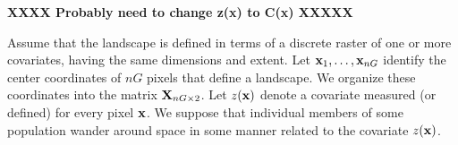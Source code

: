 {\bf XXXX Probably need to change z(x) to C(x) XXXXX}

Assume that the landscape is defined in terms of a discrete raster of
one or more covariates, having the same dimensions and extent.  Let
${\bf x}_{1},\ldots,{\bf x}_{nG}$ identify the center coordinates of
$nG$ pixels that define a landscape.  We organize these coordinates
into the matrix ${\bf X}_{nG \times 2}$.  Let $z({\bf x})$ denote a
covariate measured (or defined) for every pixel ${\bf x}$.  We suppose
that individual members of some population wander around space in some
manner related to the covariate $z({\bf x})$.

